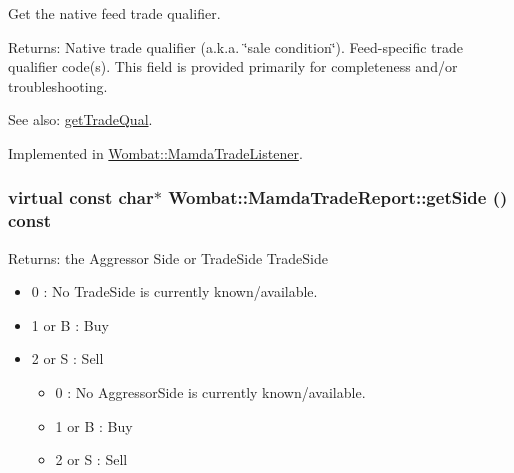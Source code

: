 Get the native feed trade qualifier. 

\begin{Desc}
\item[Returns:]Native trade qualifier (a.k.a. \char`\"{}sale condition\char`\"{}). Feed-specific trade qualifier code(s). This field is provided primarily for completeness and/or troubleshooting. \end{Desc}
\begin{Desc}
\item[See also:]\hyperlink{classWombat_1_1MamdaTradeReport_01f6e34bc27e4c6a9d2262327c2961d7}{get\-Trade\-Qual}. \end{Desc}


Implemented in \hyperlink{classWombat_1_1MamdaTradeListener_7b01373c290fe46a0a1e00a861996a06}{Wombat::Mamda\-Trade\-Listener}.\hypertarget{classWombat_1_1MamdaTradeReport_ceb8234499a7ebd85378094dbed4705a}{
\subsubsection[getSide]{\setlength{\rightskip}{0pt plus 5cm}virtual const char$\ast$ Wombat::Mamda\-Trade\-Report::get\-Side () const}}
\label{classWombat_1_1MamdaTradeReport_ceb8234499a7ebd85378094dbed4705a}


\begin{Desc}
\item[Returns:]the Aggressor Side or Trade\-Side Trade\-Side \begin{itemize}
\item 0 : No Trade\-Side is currently known/available. \item 1 or B : Buy \item 2 or S : Sell \begin{itemize}
\end{itemize}
\begin{itemize}
\item 0 : No Aggressor\-Side is currently known/available. \item 1 or B : Buy \item 2 or S : Sell \begin{itemize}
\end{itemize}
\end{itemize}
\end{itemize}
\end{Desc}


